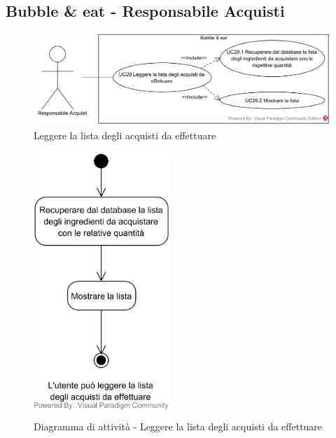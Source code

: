 \subsection{Bubble \& eat - Responsabile Acquisti}


\begin{figure}[H]
	\centering
	\includegraphics[width=15cm]{../../documenti/AnalisiDeiRequisiti/Diagrammi_img/usecase/uc3_7.png}
	\caption{\UCCaption{} Leggere la lista degli acquisti da effettuare}
\end{figure}

\begin{figure}[H]
	\centering
	\includegraphics[height=10cm]{../../documenti/AnalisiDeiRequisiti/Diagrammi_img/attivita/uc_bubble_lista_acquisti.png}
	\caption{Diagramma di attività - Leggere la lista degli acquisti da effettuare}
\end{figure}

